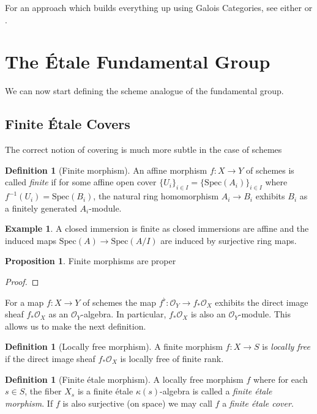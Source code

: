 \documentclass{article}
\theoremstyle{definition}
\newtheorem{proposition}[theorem]{Proposition}
\newtheorem{definition}[theorem]{Definition}
\newtheorem{example}[theorem]{Example}
\theoremstyle{remark}
\newcommand{\mc}[1]{\mathcal{#1}}
\begin{document}
For an approach which builds everything up using Galois Categories, see either \cite{grothendieck} or \cite{Lenstra}.


\section{The \'Etale Fundamental Group}

We can now start defining the scheme analogue of the fundamental group. 
\subsection{Finite \'Etale Covers}
The correct notion of covering is much more subtle in the case of schemes 
\begin{definition}[Finite morphism]
	An affine morphism $f: X \to Y$ of schemes is called \textit{finite} if for some affine open cover $\{U_i\}_{i \in I}  = \{\text{Spec}(A_i)\}_{i \in I}$ where $f^{-1}(U_i) = \text{Spec}(B_i)$, the natural ring homomorphism $A_i \to B_i$ exhibits $B_i$ as a finitely generated $A_i$-module.
\end{definition}

\begin{example}
	A closed immersion is finite as closed immersions are affine and the induced maps $\text{Spec}(A) \to \text{Spec}(A/I)$ are induced by surjective ring maps.
\end{example}

\begin{proposition}
	Finite morphisms are proper  
\end{proposition}
\begin{proof}
\end{proof}

For a map $f: X \to Y$ of schemes the map $f^{\flat}: \mc{O}_Y \to f_*\mc{O}_X$ exhibits the direct image sheaf $f_* \mc{O}_X$ as an $\mc{O}_Y$-algebra.
In particular, $f_* \mc{O}_X$ is also an $\mc{O}_Y$-module.
This allows us to make the next definition.

\begin{definition}[Locally free morphism]	
	A finite morphism $f: X \to S$ is \textit{locally free} if the direct image sheaf $f_* \mc{O}_X$ is locally free of finite rank.   
\end{definition}

\begin{definition}[Finite \'etale morphism]
	A locally free morphism $f$ where for each $s \in S$, the fiber $X_s$ is a finite \'etale $\kappa(s)$-algebra is called a \textit{finite \'etale morphism}.
	If $f$ is also surjective (on space) we may call $f$ a \textit{finite \'etale cover}.
\end{definition}
\end{document}
